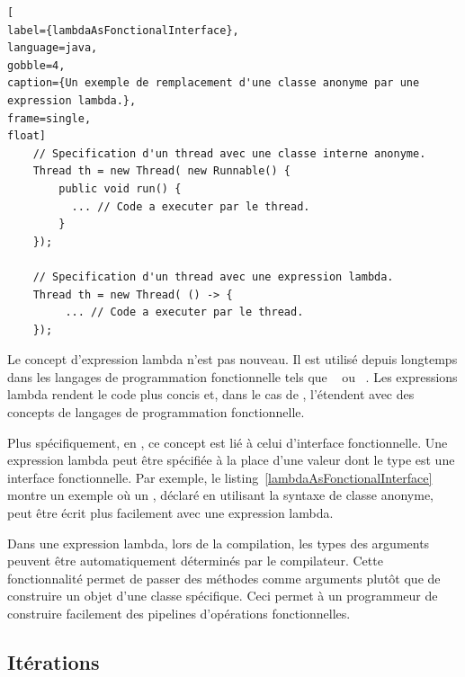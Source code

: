 \begin{lstlisting}[
label={lambdaAsFonctionalInterface},
language=java,
gobble=4,
caption={Un exemple de remplacement d'une classe anonyme par une expression lambda.},
frame=single,
float]
    // Specification d'un thread avec une classe interne anonyme.
	Thread th = new Thread( new Runnable() {
		public void run() {
          ... // Code a executer par le thread.
		}
	});

    // Specification d'un thread avec une expression lambda.
	Thread th = new Thread( () -> {
         ... // Code a executer par le thread.
	});
\end{lstlisting}


Le concept d'expression lambda n'est pas nouveau. Il est utilis\'e depuis longtemps dans les langages de programmation fonctionnelle tels que ~\citep{Steele84} ou ~\citep{HudakWad90,hutton2016programming}.
%
Les expressions lambda rendent le code plus concis et, dans le cas de , l'\'etendent avec des concepts de langages de programmation fonctionnelle. 

Plus sp\'ecifiquement, en , ce concept est li\'e \`a celui d'interface fonctionnelle. Une expression lambda peut \^etre sp\'ecifi\'ee \`a la place d'une valeur dont le type est une interface fonctionnelle. Par exemple, le listing~\ref{lambdaAsFonctionalInterface} montre un exemple o\`u un , d\'eclar\'e en utilisant la syntaxe de classe anonyme, peut \^etre \'ecrit plus facilement avec une expression lambda.

Dans une expression lambda, lors de la compilation, les types des arguments peuvent \^etre automatiquement d\'etermin\'es par le compilateur. Cette fonctionnalit\'e permet de passer des m\'ethodes comme arguments plut\^ot que de construire un objet d'une classe sp\'ecifique. Ceci permet \`a un programmeur de construire facilement des pipelines d'op\'erations fonctionnelles.


\subsection{It\'erations}


